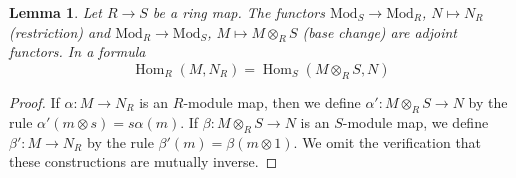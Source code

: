 \documentclass[10pt,a4paper]{amsart}
\theoremstyle{plain}
\newtheorem{lemma}[subsection]{Lemma}
\theoremstyle{definition}
\theoremstyle{remark}
\numberwithin{equation}{subsection}
\def\Hom{\mathop{\mathrm{Hom}}\nolimits}
\begin{document}
\begin{lemma}
\label{lemma-adjoint-tensor-restrict}
Let $R \to S$ be a ring map. The functors
$\text{Mod}_S \to \text{Mod}_R$, $N \mapsto N_R$ (restriction)
and $\text{Mod}_R \to \text{Mod}_S$, $M \mapsto M \otimes_R S$
(base change) are adjoint functors. In a formula
$$
\Hom_R(M, N_R) = \Hom_S(M \otimes_R S, N)
$$
\end{lemma}

\begin{proof}
If $\alpha : M \to N_R$ is an $R$-module map, then we define
$\alpha' : M \otimes_R S \to N$ by the rule
$\alpha'(m \otimes s) = s\alpha(m)$. If $\beta : M \otimes_R S \to N$
is an $S$-module map, we define $\beta' : M \to N_R$ by the rule
$\beta'(m) = \beta(m \otimes 1)$.
We omit the verification that these constructions are mutually inverse.
\end{proof}
\end{document}
